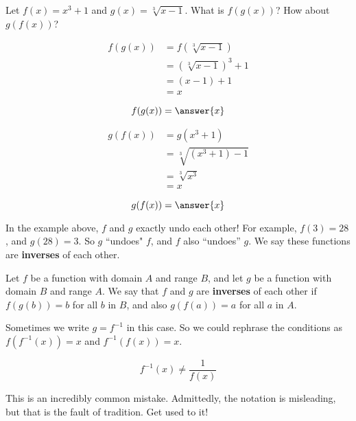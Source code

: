 \documentclass{ximera}
\begin{document}
\begin{question}
	Let $f(x) = x^3+1$ and $g(x) = \sqrt[3]{x-1}$.  What is $f(g(x))$?  How about $g(f(x))$?
	
	\begin{question}
		\begin{hint}
			\begin{align*}
				f(g(x)) &= f(\sqrt[3]{x-1})\\
				&= (\sqrt[3]{x-1})^3+1\\
				&=(x-1)+1\\
				&=x
			\end{align*}
		\end{hint}
	\[f(g(x)) = \answer{x}\]
	\end{question}
	
	\begin{question}
	\begin{hint}
			\begin{align*}
				g(f(x)) &= g(x^3+1)\\
				&= \sqrt[3]{(x^3+1) - 1}\\
				&=\sqrt[3]{x^3}\\
				&=x
			\end{align*}
		\end{hint}
	\[g(f(x)) = \answer{x}\]
	\end{question}
\end{question}

In the example above, $f$ and $g$ exactly undo each other!  For example, $f(3) = 28$, and $g(28) = 3$.  So $g$ ``undoes" $f$, and $f$ also ``undoes'' $g$.  We say these functions are \textbf{inverses} of each other.

\begin{definition}
	Let $f$ be a function with domain $A$ and range $B$, and let $g$ be a function with domain $B$ and range $A$.  We say that $f$ and $g$ are \textbf{inverses} of each other if $f(g(b)) = b$ for all $b$ in $B$, and also $g(f(a)) = a$ for all $a$ in $A$. 
	
	Sometimes we write $g = f^{-1}$ in this case.  So we could rephrase the conditions as $f(f^{-1}(x)) = x$ and $f^{-1}(f(x)) = x$.  
\end{definition}

\begin{warning}
	\[f^{-1}(x) \neq \frac{1}{f(x)}\]
	
	This is an incredibly common mistake.  Admittedly, the notation is misleading, but that is the fault of tradition.  Get used to it!

\end{warning}
\end{document}
